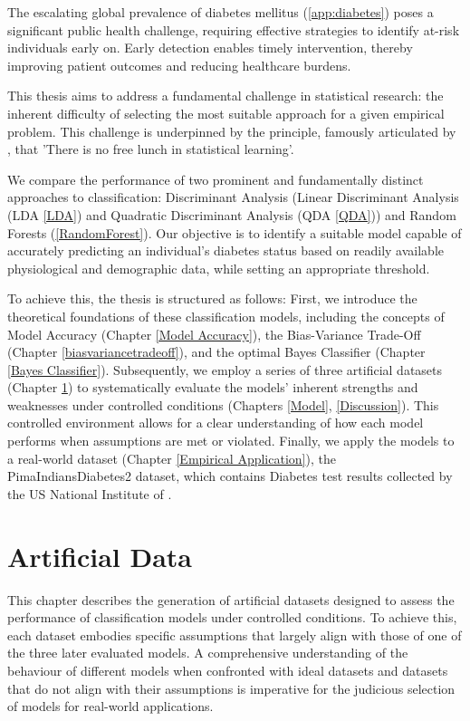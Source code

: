 \documentclass[12pt,a4paper,titlepage]{article}
\numberwithin{equation}{section}
\numberwithin{table}{section}
\numberwithin{figure}{section}
\begin{document}
The escalating global prevalence of diabetes mellitus (\ref{app:diabetes}) poses a significant public health challenge, requiring effective strategies to identify at-risk individuals early on. Early detection enables timely intervention, thereby improving patient outcomes and reducing healthcare burdens.

\noindent This thesis aims to address a fundamental challenge in statistical research: the inherent difficulty of selecting the most suitable approach for a given empirical problem. This challenge is underpinned by the principle, famously articulated by \cite{noffreelunch}, that 'There is no free lunch in statistical learning'.

\noindent We compare the performance of two prominent and fundamentally distinct approaches to classification: Discriminant Analysis (Linear Discriminant Analysis (LDA \ref{LDA}) and Quadratic Discriminant Analysis (QDA \ref{QDA})) and Random Forests (\ref{RandomForest}).
Our objective is to identify a suitable model capable of accurately predicting an individual's diabetes status based on readily available physiological and demographic data, while setting an appropriate threshold.

\noindent To achieve this, the thesis is structured as follows: First, we introduce the theoretical foundations of these classification models, including the concepts of Model Accuracy (Chapter \ref{Model Accuracy}), the Bias-Variance Trade-Off (Chapter \ref{biasvariancetradeoff}), and the optimal Bayes Classifier (Chapter \ref{Bayes Classifier}). Subsequently, we employ a series of three artificial datasets (Chapter \ref{Artificial Data}) to systematically evaluate the models' inherent strengths and weaknesses under controlled conditions (Chapters \ref{Model},  \ref{Discussion}). This controlled environment allows for a clear understanding of how each model performs when assumptions are met or violated.
Finally, we apply the models to a real-world dataset (Chapter \ref{Empirical Application}), the PimaIndiansDiabetes2 dataset, which contains Diabetes test results collected by the US National Institute of \cite{pima}.

\section{Artificial Data}\label{Artificial Data}
This chapter describes the generation of artificial datasets designed to assess the performance of classification models under controlled conditions. To achieve this, each dataset embodies specific assumptions that largely align with those of one of the three later evaluated models. A comprehensive understanding of the behaviour of different models when confronted with ideal datasets and datasets that do not align with their assumptions is imperative for the judicious selection of models for real-world applications.
    
\end{document}
